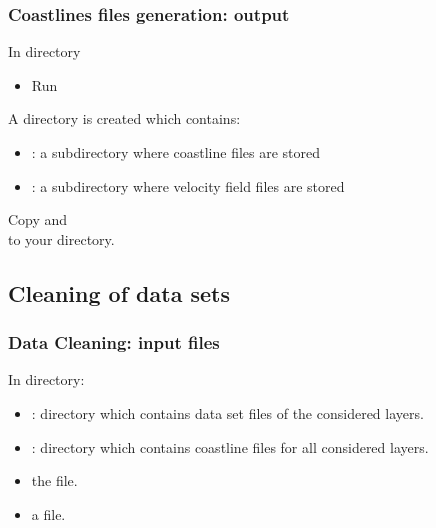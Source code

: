 

\begin{frame}
\frametitle{Coastlines files generation: output}

\centerline{In  directory}

\begin{itemize}
\item Run 
\end{itemize}
 
\vspace{0.5cm}

\centerline{
{A  directory is created} which contains:
}
\begin{itemize}
\item {}: a subdirectory where coastline files  are stored
\item {}: a subdirectory where velocity field files are stored
\end{itemize}

\Large{
\begin{center}
Copy  and  \\
to your  directory.
\end{center}

}

\end{frame}

\subsection{Cleaning of data sets}

\begin{frame}
\frametitle{Data Cleaning: input files}

\centerline{In  directory:}

\begin{itemize}
\item {}: directory which contains data set files of the considered layers.
\item {}: directory which contains coastline  files for all considered layers.
\item the  file.
\item a  file.
\end{itemize}

\end{frame}

